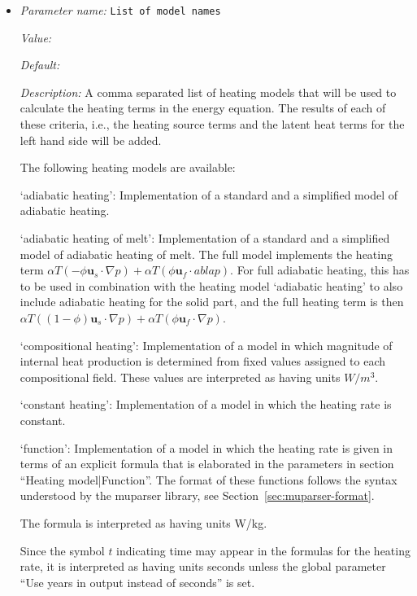 \begin{itemize}
\item {\it Parameter name:} {\tt List of model names}
\label{parameters:Heating model/List of model names}


{\it Value:} 


{\it Default:} 


{\it Description:} A comma separated list of heating models that will be used to calculate the heating terms in the energy equation. The results of each of these criteria, i.e., the heating source terms and the latent heat terms for the left hand side will be added.

The following heating models are available:

`adiabatic heating': Implementation of a standard and a simplified model of adiabatic heating.

`adiabatic heating of melt': Implementation of a standard and a simplified model of adiabatic heating of melt. The full model implements the heating term 
$\alpha T (-\phi \mathbf u_s \cdot \nabla p) + \alpha T (\phi \mathbf u_f \cdot 
abla p)$.
For full adiabatic heating, this has to be used in combination with the heating model `adiabatic heating' to also include adiabatic heating for the solid part, and the full heating term is then $\alpha T ((1-\phi) \mathbf u_s \cdot \nabla p) + \alpha T (\phi \mathbf u_f \cdot \nabla p)$.

`compositional heating': Implementation of a model in which magnitude of internal heat production is determined from fixed values assigned to each compositional field. These values are interpreted as having units $W/m^3$.

`constant heating': Implementation of a model in which the heating rate is constant.

`function': Implementation of a model in which the heating rate is given in terms of an explicit formula that is elaborated in the parameters in section ``Heating model|Function''. The format of these functions follows the syntax understood by the muparser library, see Section~\ref{sec:muparser-format}.

The formula is interpreted as having units W/kg.

Since the symbol $t$ indicating time may appear in the formulas for the heating rate, it is interpreted as having units seconds unless the global parameter ``Use years in output instead of seconds'' is set.


\end{itemize}
